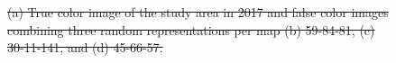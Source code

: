 \documentclass[journal,article,submit,pdftex,moreauthors]{Definitions/mdpi}
\providecommand{\DIFdel}[1]{{\protect\color{red}\sout{#1}}}                      %
\providecommand{\DIFdelFL}[1]{\DIFdel{#1}} %
\providecommand{\DIFaddendFL}{} %
\providecommand{\DIFdelbeginFL}{} %
\providecommand{\DIFdelendFL}{} %
\begin{document}
\begin{figure}[H]
\begin{subfigure}[t]{0.23\linewidth}
	\DIFaddendFL \caption{}
	\label{fig:color_map_c}
	\end{subfigure}
	\DIFdelbeginFL %
{%
\DIFdelFL{(a) True color image of the study area in 2017 and false color images combining three random representations per map (b) 59-84-81, (c) 30-11-141, and (d) 45-66-57.}}

{%
}
{%
}
{%
}
\DIFdelendFL \begin{subfigure}[t]{0.23\linewidth}
		\centering
	\DIFdelbeginFL %

\end{subfigure}
\end{figure}
\end{document}
